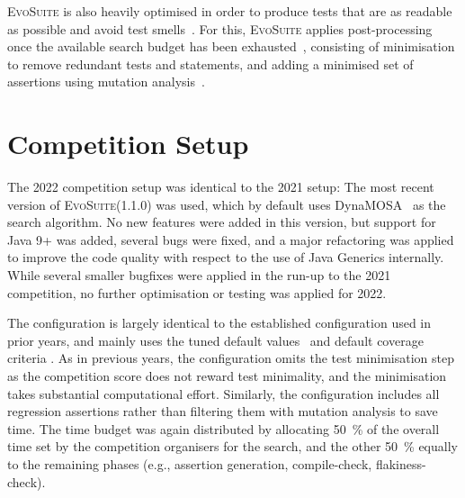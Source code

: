 \documentclass[sigconf]{acmart}
\newcommand{\EVOSUITE}{\textsc{EvoSuite}\xspace}
\begin{document}
\EVOSUITE is also heavily optimised in order to produce tests that are as readable as possible and avoid test smells~\cite{panichella2020revisiting}. For this, \EVOSUITE applies post-processing once the available search budget has been exhausted~\cite{FrA11c,FrA13a}, consisting of minimisation to remove redundant tests and statements, and adding a minimised set of assertions using mutation analysis~\cite{10.1109/TSE.2011.93}. 





\section{Competition Setup}

The 2022 competition setup was identical to the 2021 setup: The most recent
version of \EVOSUITE (1.1.0) was used, which by default uses
DynaMOSA~\cite{dynamosa} as the search algorithm. No new features were added in
this version, but support for Java 9+ was added, several bugs were fixed, and a
major refactoring was applied to improve the code quality with respect to the
use of Java Generics internally. While several smaller bugfixes were applied in
the run-up to the 2021 competition, no further optimisation or testing was
applied for 2022.

The configuration is largely identical to the established configuration used in
prior years, and mainly uses the tuned default
values~\cite{arcuri2013parameter} and default coverage criteria
\cite{rojas2015combining}.
%
As in previous years, the configuration omits the test minimisation step as the
competition score does not reward test minimality, and the minimisation takes
substantial computational effort. Similarly, the configuration includes all
regression assertions rather than filtering them with mutation analysis to save
time.
%
The time budget was again distributed by allocating \SI{50}{\percent} of the overall time
set by the competition organisers for the search, and the other \SI{50}{\percent} equally to
the remaining phases (e.g., assertion generation, compile-check,
flakiness-check).
\end{document}
